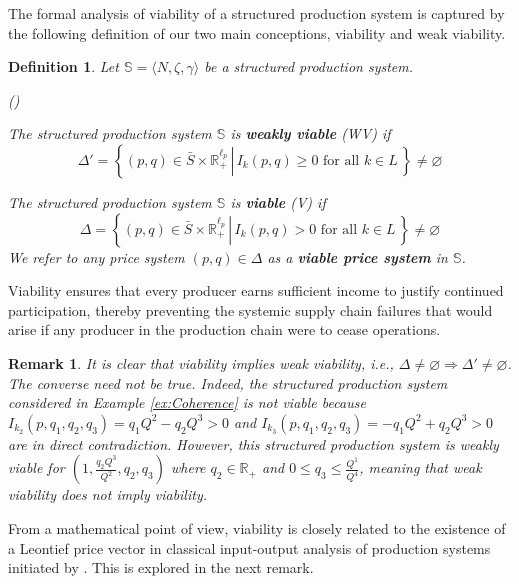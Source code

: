 \documentclass[11pt,fleqn]{article}
\newcounter{llst}
\newenvironment{abet}{\begin{list}{\rm (\alph{llst})}{\usecounter{llst}
		\setlength{\itemindent}{0em} \setlength{\leftmargin}{3em}
		\setlength{\labelwidth}{2em} \setlength{\labelsep}{1em}}}{\end{list}}
\newtheorem{definition}[theorem]{Definition}
\newtheorem{remark}[theorem]{Remark}
\begin{document}
\noindent
The formal analysis of viability of a structured production system is captured by the following definition of our two main conceptions, viability and weak viability.

\begin{definition}
	Let $\mathbb S = \langle N, \zeta , \gamma \rangle$ be a structured production system. 
	\begin{abet}
		\item The structured production system $\mathbb S$ is \textbf{weakly viable} (WV) if 
		\begin{equation*}  
		\Delta' = \left\{ \left. (p,q) \in \bar S \times \mathbb R^{\ell_p}_+ \, \right| \, I_k (p,q) \geqslant 0 \mbox{ for all } k \in L \, \right\} \neq \varnothing
		\end{equation*}
		\item The structured production system $\mathbb S$ is \textbf{viable} (V) if 
		\begin{equation*}  
		\Delta = \left\{ \left. (p,q) \in \bar S \times \mathbb R^{\ell_p}_+ \, \right| \, I_k (p,q) > 0 \mbox{ for all } k \in L \, \right\} \neq \varnothing
		\end{equation*}
		We refer to any price system $(p,q) \in \Delta$ as a \textbf{viable price system} in $\mathbb S$.
	\end{abet}
\end{definition}

\noindent
Viability ensures that every producer earns sufficient income to justify continued participation, thereby preventing the systemic supply chain failures that would arise if any producer in the production chain were to cease operations.

\begin{remark}\label{rem: viable vs coherent}
	It is clear that viability implies weak viability, i.e., $\Delta\neq \varnothing \Rightarrow \Delta'\neq \varnothing$. The converse need not be true. Indeed, the structured production system considered in Example \ref{ex:Coherence} is not viable because $I_{k_2} (p,q_1,q_2,q_3) = q_1Q^2 -q_2Q^3 >0$ and $I_{k_3} (p,q_1,q_2,q_3) = -q_1Q^2 +q_2Q^3 >0$ are in direct contradiction. However, this structured production system is weakly viable for $\left(1, \frac{q_2Q^3}{Q^2}, q_2,q_3\right)$ where $q_2\in \mathbb{R}_+$ and $0 \leqslant q_3\leqslant \frac{Q^1}{Q^4}$, meaning that weak viability does not imply viability. 
\end{remark}

\noindent
From a mathematical point of view, viability is closely related to the existence of a Leontief price vector in classical input-output analysis of production systems initiated by \citet{Leontief1936,Leontief1941}. This is explored in the next remark. 
\end{document}

